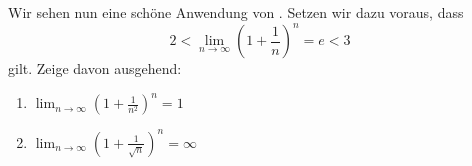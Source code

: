 \begin{exercise}
  Wir sehen nun eine schöne Anwendung von . Setzen wir
  dazu voraus, dass
  \[
    2
    <
    \lim_{n \to \infty} \left( 1 + \frac{1}{n} \right)^n
    =
    e
    <
    3
  \]
  gilt. Zeige davon ausgehend:
  \begin{enumerate}
  \item
    $\displaystyle \lim_{n \to \infty} \left( 1 + \frac{1}{n^2} \right)^n = 1$
  \item
    $\displaystyle \lim_{n \to \infty} \left( 1 + \frac{1}{\sqrt{n}} \right)^n =
    \infty$
  \end{enumerate}
\end{exercise}
